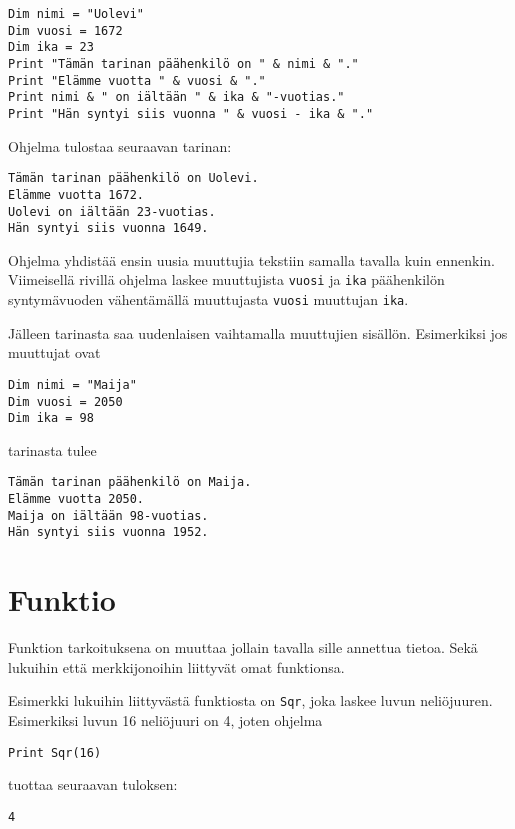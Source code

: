 \documentclass[oneside,11pt,a4paper,finnish]{book}
\begin{document}
\begin{verbatim}
Dim nimi = "Uolevi"
Dim vuosi = 1672
Dim ika = 23
Print "Tämän tarinan päähenkilö on " & nimi & "."
Print "Elämme vuotta " & vuosi & "."
Print nimi & " on iältään " & ika & "-vuotias."
Print "Hän syntyi siis vuonna " & vuosi - ika & "."
\end{verbatim}

Ohjelma tulostaa seuraavan tarinan:

\begin{verbatim}
Tämän tarinan päähenkilö on Uolevi.
Elämme vuotta 1672.
Uolevi on iältään 23-vuotias.
Hän syntyi siis vuonna 1649.
\end{verbatim}

Ohjelma yhdistää ensin uusia muuttujia tekstiin
samalla tavalla kuin ennenkin.
Viimeisellä rivillä ohjelma laskee muuttujista
\texttt{vuosi} ja \texttt{ika} päähenkilön syntymävuoden
vähentämällä muuttujasta \texttt{vuosi} muuttujan \texttt{ika}.

Jälleen tarinasta saa uudenlaisen vaihtamalla muuttujien sisällön.
Esimerkiksi jos muuttujat ovat

\begin{verbatim}
Dim nimi = "Maija"
Dim vuosi = 2050
Dim ika = 98
\end{verbatim}

tarinasta tulee

\begin{verbatim}
Tämän tarinan päähenkilö on Maija.
Elämme vuotta 2050.
Maija on iältään 98-vuotias.
Hän syntyi siis vuonna 1952.
\end{verbatim}

\section{Funktio}

Funktion tarkoituksena on
muuttaa jollain tavalla
sille annettua tietoa.
Sekä lukuihin että merkkijonoihin
liittyvät omat funktionsa.

Esimerkki lukuihin liittyvästä
funktiosta on \texttt{Sqr},
joka laskee luvun neliöjuuren.
Esimerkiksi luvun 16 neliöjuuri on 4,
joten ohjelma

\begin{verbatim}
Print Sqr(16)
\end{verbatim}

tuottaa seuraavan tuloksen:

\begin{verbatim}
4
\end{verbatim}
\end{document}
